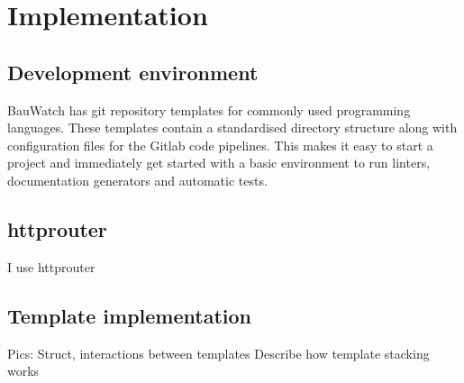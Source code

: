 \chapter{Implementation}
\section{Development environment}
BauWatch has git repository templates for commonly used programming languages. These templates contain a standardised directory structure along with configuration
files for the Gitlab code pipelines. This makes it easy to start a project and immediately get started with a basic environment to run linters, documentation
generators and automatic tests.

\section{httprouter}
I use httprouter


\section{Template implementation}
Pics:
Struct, interactions between templates
Describe how template stacking works
